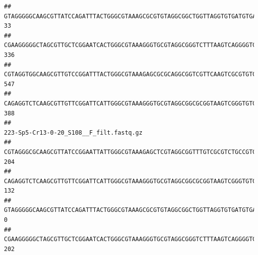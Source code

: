 \documentclass[]{article}
\begin{document}
\begin{verbatim}
## GTAGGGGGCAAGCGTTATCCAGATTTACTGGGCGTAAAGCGCGTGTAGGCGGCTGGTTAGGTGTGATGTGAAATCTTCCGGCTCAACCGGAAAACTGCATTGCAAACCGGCCTGGCTAGAGTGCAGGAGAGGGAAGCGGAATTCCAGGTGTAGCGGTGAAATGCGTAGATATCTGGAGGAACACCAGTGGCGAAGGCGGCTTCCTGGCCTGCAACTGACGCTGAGACGCGAAAGCGTGGGGAGCGAAC                                       33
## CGAAGGGGGCTAGCGTTGCTCGGAATCACTGGGCGTAAAGGGTGCGTAGGCGGGTCTTTAAGTCAGGGGTGAAATCCTGGAGCTCAACTCCAGAACTGCCTTTGATACTGAAGATCTTGAGTTCGGGAGAGGTGAGTGGAACTGCGAGTGTAGAGGTGAAATTCGTAGATATTCGCAAGAACACCAGTGGCGAAGGCGGCTCACTGGCCCGATACTGACGCTGAGGCACGAAAGCGTGGGGAGCAAACA                                     336
## CGTAGGTGGCAAGCGTTGTCCGGATTTACTGGGCGTAAAGAGCGCGCAGGCGGTCGTTCAAGTCGCGTGTGAAAGCCCCCGGCTCAACTGGGGAGGGTCACGCGATACTGATCGACTCGAAGGCAGGAGAGGGTAGTGGAATTCCCGGTGTAGTGGTGAAATGCGTAGATATCGGGAGGAACACCAGTGGCGAAGGCGACTACCTGGCCTGTTCTTGACGCTGAGGCGCGAAAGCTAGGGGAGCAAACG                                     547
## CAGAGGTCTCAAGCGTTGTTCGGATTCATTGGGCGTAAAGGGTGCGTAGGCGGCGCGGTAAGTCGGGTGTGAAATCTCGGGGCTTAACTCCGAAACTGCATTCGATACTGCCGTGCTTGAGGACTGGAGAGGAGACTGGAATTTACGGTGTAGCGGTGAAATGCGTAGATATCGTAAGGAAGACCAGTGGCGAAGGCGGGTCTCTGGACAGTTCCTGACGCTGAGGCACGAAGGCCAGGGGAGCAAACG                                     388
##                                                                                                                                                                                                                                                           223-Sp5-Cr13-0-20_S108__F_filt.fastq.gz
## CGTAGGGCGCAAGCGTTATCCGGAATTATTGGGCGTAAAGAGCTCGTAGGCGGTTTGTCGCGTCTGCCGTGAAAGTCCGGGGCTCAACTCCGGATCTGCGGTGGGTACGGGCAGACTAGAGTGATGTAGGGGAGACTGGAATTCCTGGTGTAGCGGTGAAATGCGCAGATATCAGGAGGAACACCGATGGCGAAGGCAGGTCTCTGGGCATTAACTGACGCTGAGGAGCGAAAGCATGGGGAGCGAACA                                     204
## CAGAGGTCTCAAGCGTTGTTCGGATTCATTGGGCGTAAAGGGTGCGTAGGCGGCGCGGTAAGTCGGGTGTGAAATCTCGGAGCTTAACTCCGAAACTGCATTCGATACTGCCGTGCTTGAGGACTGGAGAGGAGACTGGAATTTACGGTGTAGCGGTGAAATGCGTAGATATCGTAAGGAAGACCAGTGGCGAAGGCGGGTCTCTGGACAGTTCCTGACGCTGAGGCACGAAGGCCAGGGGAGCAAACG                                     132
## GTAGGGGGCAAGCGTTATCCAGATTTACTGGGCGTAAAGCGCGTGTAGGCGGCTGGTTAGGTGTGATGTGAAATCTTCCGGCTCAACCGGAAAACTGCATTGCAAACCGGCCTGGCTAGAGTGCAGGAGAGGGAAGCGGAATTCCAGGTGTAGCGGTGAAATGCGTAGATATCTGGAGGAACACCAGTGGCGAAGGCGGCTTCCTGGCCTGCAACTGACGCTGAGACGCGAAAGCGTGGGGAGCGAAC                                        0
## CGAAGGGGGCTAGCGTTGCTCGGAATCACTGGGCGTAAAGGGTGCGTAGGCGGGTCTTTAAGTCAGGGGTGAAATCCTGGAGCTCAACTCCAGAACTGCCTTTGATACTGAAGATCTTGAGTTCGGGAGAGGTGAGTGGAACTGCGAGTGTAGAGGTGAAATTCGTAGATATTCGCAAGAACACCAGTGGCGAAGGCGGCTCACTGGCCCGATACTGACGCTGAGGCACGAAAGCGTGGGGAGCAAACA                                     202

\end{verbatim}
\end{document}
